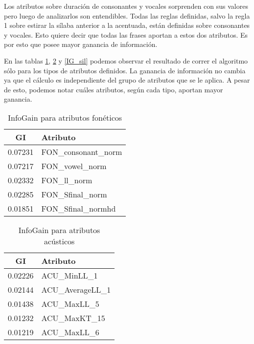 Los atributos sobre duración de consonantes y vocales sorprenden con sus valores pero luego de analizarlos son entendibles. Todas las reglas definidas, salvo la regla 1 sobre estirar la sílaba anterior a la acentuada, están definidas sobre consonantes y vocales. Esto quiere decir que todas las frases aportan a estos dos atributos. Es por esto que posee mayor ganancia de información.

En las tablas \ref{IG_fon}, \ref{IG_acu} y \ref{IG_sil} podemos observar el resultado de correr el algoritmo sólo para los tipos de atributos definidos. La ganancia de información no cambia ya que el cálculo es independiente del grupo de atributos que se le aplica. A pesar de esto, podemos notar cuáles atributos, según cada tipo, aportan mayor ganancia. 

\begin{minipage}{.5\linewidth}
  	\begin{table}[H]
  	\centering
  	\begin{tabular}{cl}
  		\hline
  		\textbf{GI} & \textbf{Atributo} \\ \hline
		 0.07231 & FON\_consonant\_norm \\
		 0.07217 & FON\_vowel\_norm \\
		 0.02332 & FON\_ll\_norm \\
		 0.02285 & FON\_Sfinal\_norm \\
		 0.01851 & FON\_Sfinal\_normhd \\
  		\hline
  	\end{tabular}
  	\caption{InfoGain para atributos fonéticos}
  	\label{IG_fon}
	\end{table}
\end{minipage}
\begin{minipage}{.5\linewidth}	
  	\begin{table}[H]
  		\centering
  		\begin{tabular}{cl}
  			\hline
  			\textbf{GI} & \textbf{Atributo} \\ \hline
			0.02226 & ACU\_MinLL\_1 \\
			0.02144 & ACU\_AverageLL\_1 \\
			0.01438 & ACU\_MaxLL\_5 \\
			0.01232 & ACU\_MaxKT\_15 \\
			0.01219 & ACU\_MaxLL\_6 \\
  			\hline
  		\end{tabular}
  		\caption{InfoGain para atributos acústicos}
  		\label{IG_acu}
  	\end{table}
\end{minipage}
  	
